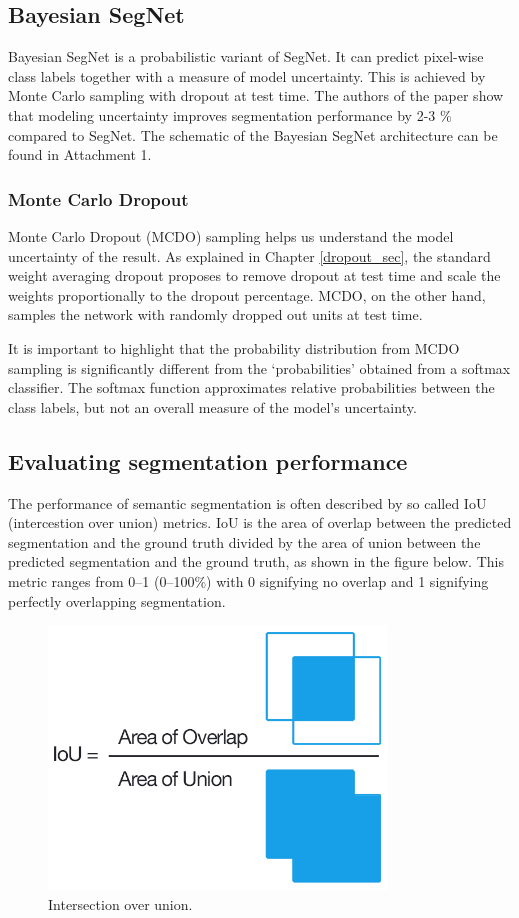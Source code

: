 \subsection{Bayesian SegNet}

Bayesian SegNet is a probabilistic variant of SegNet. It can predict pixel-wise class labels together with a measure of model uncertainty.  This is achieved by Monte Carlo sampling with dropout at test time. The authors of the paper show that modeling uncertainty improves segmentation performance by 2-3 \% compared to SegNet. The schematic of the Bayesian SegNet architecture can be found in Attachment 1. \cite{bayesian}

\subsubsection{Monte Carlo Dropout}

Monte Carlo Dropout (MCDO) sampling helps us understand the model uncertainty of the result. As explained in Chapter \ref{dropout_sec}, the standard weight averaging dropout proposes to remove dropout at test time and scale the weights proportionally to the dropout percentage. MCDO, on the other hand, samples the network with randomly dropped out units at test time. \cite{bayesian}

It is important to highlight that the probability distribution from MCDO sampling is significantly different from the ‘probabilities’ obtained from a softmax classifier. The softmax function approximates relative probabilities between the class labels, but not an overall measure of the model’s uncertainty. \cite{bayesian}

\subsection{Evaluating segmentation performance}

The performance of semantic segmentation is often described by so called IoU (intercestion over union) metrics. IoU is the area of overlap between the predicted segmentation and the ground truth divided by the area of union between the predicted segmentation and the ground truth, as shown in the figure below. This metric ranges from 0–1 (0–100\%) with 0 signifying no overlap and 1 signifying perfectly overlapping segmentation. \cite{iou}

\vspace{4mm}
\begin{figure}[h]
	\begin{center}
		\includegraphics*[width=9cm, keepaspectratio]{obr/iou.png}
	\end{center}
	\vspace{4mm}
	\caption{Intersection over union. \cite{iou}} 
	\label{iou}
\end{figure}




